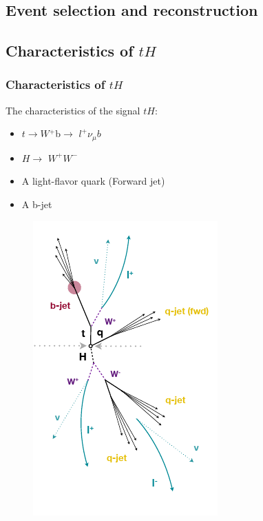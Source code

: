 \documentclass[11pt]{beamer}
\begin{document}
\begin{frame}
\section{Event selection and reconstruction}
\subsection{Characteristics of $tH$}
\frametitle{Characteristics of $tH$}
The characteristics of the signal $tH$:

\begin{multicols}{2}
	\small{
\begin{itemize}
\item $t\rightarrow W$$^+$b$\rightarrow$ $l^+ \nu_\mu b$
\item $H\rightarrow$ $W^+$$W^-$ 

\item A light-flavor quark (Forward jet)
\item  A b-jet  
\end{itemize}
}
\columnbreak
\begin{figure}
	\centering
	\includegraphics[scale=0.5]{figures/jet.png}
\end{figure}
\end{multicols}
\end{frame}
\end{document}
